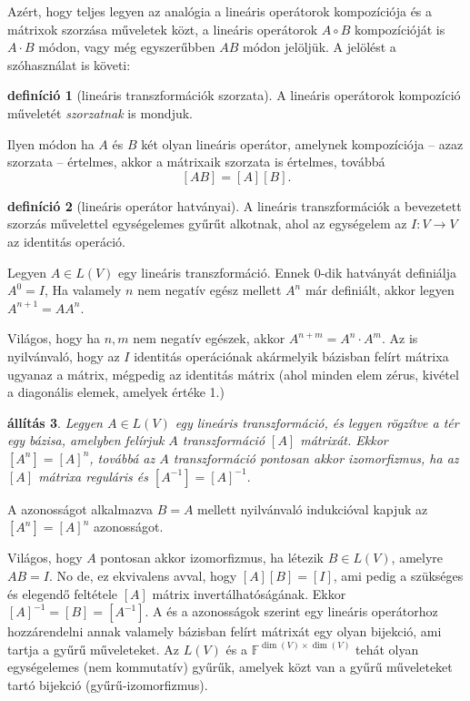 \documentclass[a4paper, showtrims]{memoir}
\makeatletter
\renewenvironment{proof}[1][\proofname]
    {\par\pushQED{\qed}%
    \normalfont \topsep6\p@\@plus6\p@\relax
    \trivlist
    \item[\hskip\labelsep
        \itshape
    #1\@addpunct{:}]\ignorespaces}
    {\popQED\endtrivlist\@endpefalse}
\theoremstyle{plain}
\newtheorem{proposition}{állítás}[chapter]
\theoremstyle{remark}
\theoremstyle{definition}
\newtheorem{definition}[proposition]{definíció}
\makeatother
\begin{document}
Azért, hogy teljes legyen az analógia a lineáris operátorok kompozíciója és a mátrixok szorzása műveletek közt,
a lineáris operátorok $A\circ B$ kompozícióját is $A\cdot B$ módon, vagy még egyszerűbben $AB$ módon jelöljük.
A jelölést a szóhasználat is követi:
\begin{definition}[lineáris transzformációk szorzata]
	A lineáris operátorok kompozíció műveletét \emph{szorzatnak} is mondjuk.
\end{definition}
\noindent Ilyen módon ha $A$ és $B$ két olyan lineáris operátor, amelynek kompozíciója -- azaz szorzata -- értelmes,
akkor a mátrixaik szorzata is értelmes, továbbá
\begin{equation}\label{eq:gyuru}
	[AB]=[A][B].
\end{equation}
\begin{definition}[lineáris operátor hatványai]
	A lineáris transzformációk a bevezetett szorzás művelettel egységelemes gyűrűt alkotnak,
	ahol az egységelem az
	$I:V\to V$ az identitás operáció.

	Legyen $A\in L\left( V \right)$ egy lineáris transzformáció.
	Ennek $0$-dik hatványát definiálja $A^0=I$,
	Ha valamely $n$ nem negatív egész mellett $A^n$ már definiált,
	akkor legyen $A^{n+1}=AA^n$.
\end{definition}
Világos, hogy ha $n,m$ nem negatív egészek, akkor $A^{n+m}=A^n\cdot A^m$.
Az is nyilvánvaló, hogy az $I$ identitás operációnak akármelyik bázisban felírt mátrixa ugyanaz a mátrix,
mégpedig az identitás mátrix (ahol minden elem zérus, kivétel a diagonális elemek, amelyek értéke 1.)
\begin{proposition}
	Legyen $A\in L\left( V \right)$ egy lineáris transzformáció, és legyen rögzítve a tér egy bázisa,
	amelyben felírjuk $A$ transzformáció $[A]$ mátrixát.
	Ekkor
	\(
	\left[ A^n \right]=\left[ A \right]^n
	\),
	továbbá az $A$ transzformáció pontosan akkor izomorfizmus, 
    ha az $[A]$ mátrixa reguláris és
	\begin{math}
		\left[ A^{-1} \right]
		=
		\left[ A \right]^{-1}.
	\end{math}
\end{proposition}
\begin{proof}
	A  azonosságot alkalmazva $B=A$ mellett nyilvánvaló indukcióval kapjuk az
	$\left[ A^n \right]=\left[ A \right]^n$
	azonosságot.

	Világos, hogy $A$ pontosan akkor izomorfizmus,
	ha létezik $B\in L\left( V \right)$, amelyre $AB=I$.
	No de, ez ekvivalens avval, hogy $[A][B]=[I]$, ami pedig a szükséges és elegendő feltétele
	$[A]$ mátrix invertálhatóságának.
	Ekkor $[A]^{-1}=[B]=\left[ A^{-1} \right]$.
\end{proof}
A  és a  azonosságok szerint 
egy lineáris operátorhoz hozzárendelni annak valamely bázisban
felírt mátrixát egy olyan bijekció, ami tartja a gyűrű műveleteket.
Az $L\left( V \right)$ és a $\mathbb{F}^{\dim(V)\times \dim(V)}$ tehát olyan egységelemes (nem kommutatív) gyűrűk,
amelyek közt van a gyűrű műveleteket tartó bijekció (gyűrű-izomorfizmus).
\end{document}

